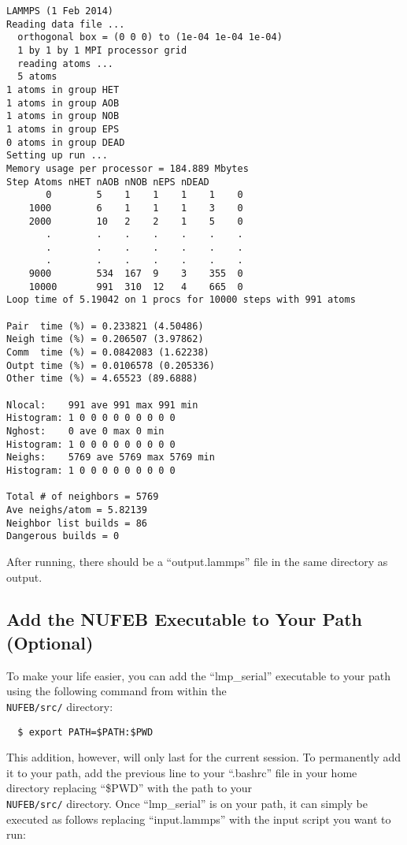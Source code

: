 \documentclass[11pt,a4paper,openright]{article}
\begin{document}
\begin{verbatim}
LAMMPS (1 Feb 2014)
Reading data file ...
  orthogonal box = (0 0 0) to (1e-04 1e-04 1e-04)
  1 by 1 by 1 MPI processor grid
  reading atoms ...
  5 atoms
1 atoms in group HET
1 atoms in group AOB
1 atoms in group NOB
1 atoms in group EPS
0 atoms in group DEAD
Setting up run ...
Memory usage per processor = 184.889 Mbytes
Step Atoms nHET nAOB nNOB nEPS nDEAD
       0        5    1    1    1    1    0
    1000        6    1    1    1    3    0
    2000        10   2    2    1    5    0
       .        .    .    .    .    .    .
       .        .    .    .    .    .    .
       .        .    .    .    .    .    .
    9000        534  167  9    3    355  0
    10000       991  310  12   4    665  0
Loop time of 5.19042 on 1 procs for 10000 steps with 991 atoms

Pair  time (%) = 0.233821 (4.50486)
Neigh time (%) = 0.206507 (3.97862)
Comm  time (%) = 0.0842083 (1.62238)
Outpt time (%) = 0.0106578 (0.205336)
Other time (%) = 4.65523 (89.6888)

Nlocal:    991 ave 991 max 991 min
Histogram: 1 0 0 0 0 0 0 0 0 0
Nghost:    0 ave 0 max 0 min
Histogram: 1 0 0 0 0 0 0 0 0 0
Neighs:    5769 ave 5769 max 5769 min
Histogram: 1 0 0 0 0 0 0 0 0 0

Total # of neighbors = 5769
Ave neighs/atom = 5.82139
Neighbor list builds = 86
Dangerous builds = 0
\end{verbatim}

\noindent
After running, there should be a ``output.lammps'' file in the same directory as output.

\subsection{Add the NUFEB Executable to Your Path (Optional)}

\noindent
To make your life easier, you can add the ``lmp\_serial'' executable to your path using the following command from within the \\ {\tt NUFEB/src/} directory:

\begin{verbatim}
  $ export PATH=$PATH:$PWD
\end{verbatim}

\noindent
This addition, however, will only last for the current session.  To permanently add it to your path, add the previous line to your ``.bashrc'' file in your home directory replacing ``\$PWD'' with the path to your \\ {\tt NUFEB/src/} directory.  Once ``lmp\_serial'' is on your path, it can simply be executed as follows replacing ``input.lammps'' with the input script you want to run:
\end{document}
